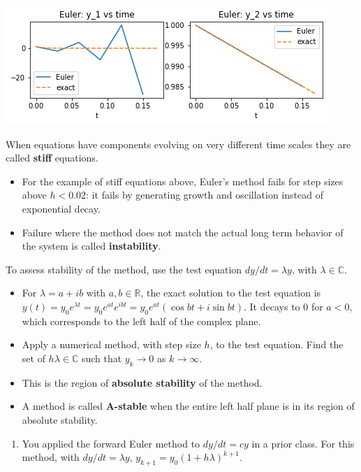 \documentclass[12pt,letterpaper,noanswers]{exam}
\begin{document}
\includegraphics[scale=0.9]{img/C19stiff.png}
\begin{tcolorbox}
When equations have components evolving on very different time scales they are called \textbf{stiff} equations.
\begin{itemize}
\itemsep0pt
    \item For the example of stiff equations above, Euler's method fails for step sizes above $h<0.02$: it fails by generating growth and oscillation instead of exponential decay.
    \item Failure where the method does not match the actual long term behavior of the system is called \textbf{instability}.
\end{itemize}
\end{tcolorbox}
\begin{tcolorbox}
To assess stability of the method, use the test equation $dy/dt = \lambda y$, with $\lambda \in \mathbb{C}$.
\begin{itemize}
\itemsep0pt
\item For $\lambda = a + ib$ with $a,b\in\mathbb{R}$, the exact solution to the test equation is $y(t) = y_0e^{\lambda t} = y_0e^{at}e^{ibt} = y_0e^{at}(\cos bt + i \sin bt)$.  It decays to $0$ for $a<0$, which corresponds to the left half of the complex plane.
    \item Apply a numerical method, with step size $h$, to the test equation.  Find the set of $h\lambda \in \mathbb{C}$ such that $y_k\rightarrow 0$ as $k\rightarrow\infty$.
    \item This is the region of \textbf{absolute stability} of the method.
    \item A method is called \textbf{A-stable} when the entire left half plane is in its region of absolute stability.
\end{itemize}
\end{tcolorbox}
\begin{enumerate}[resume]
    \item You applied the forward Euler method to $dy/dt = cy$ in a prior class.  For this method, with $dy/dt = \lambda y$, $y_{k+1} = y_0(1+h\lambda)^{k+1}$.  
\end{enumerate}
\end{document}
